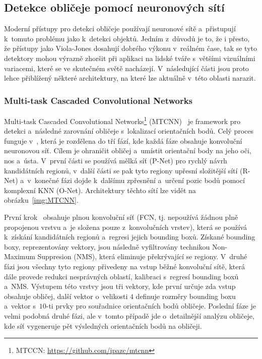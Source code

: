 \subsection{Detekce obličeje pomocí neuronových sítí}
Moderní přístupy pro detekci obličeje používají neuronové sítě a~přistupují k~tomuto problému jako k~detekci objektů. Jedním z~důvodů je to, že i přesto, že přístupy jako Viola-Jones dosahují dobrého výkonu v~reálném čase, tak se tyto detektory mohou výrazně zhoršit při aplikaci na lidské tváře s~většími vizuálními variacemi, které se ve skutečném světě nacházejí. V~následující části jsou proto lehce přiblížený některé architektury, na které lze aktuálně v~této oblasti narazit.

\subsubsection{Multi-task Cascaded Convolutional Networks}
Multi-task Cascaded Convolutional Networks\footnote{MTCCN: \url{https://github.com/ipazc/mtcnn}} (MTCNN)~\cite{website:MTCNN} je framework pro detekci a~následné zarovnání obličeje s~lokalizací orientačních bodů. Celý proces funguje v~\emph{}, která je rozdělena do tří fází, kde každá fáze obsahuje konvoluční neuronovou síť. Cílem je ohraničit obličej a~umístit orientační body na jeho oči, nos a~ústa. V~první části se používá mělká síť (P-Net) pro rychlý návrh kandidátních regionů, v~další části se pak tyto regiony upřesní složitější sítí (R-Net) a~v~konečné fázi dojde k~dalšímu zpřesnění a~určení pozic bodů pomocí komplexní KNN (O-Net). Architektury těchto sítí lze vidět na obrázku~\ref{img:MTCNN}.

První krok~\cite{website:MTCNN, article:MTCNN} obsahuje plnou konvoluční síť (FCN, tj. nepoužívá žádnou plně propojenou vrstvu a~je složena pouze z~konvolučních vrstev), která se používá k~získání kandidátních regionů a~regresi jejich bounding boxů. Získané bounding boxy, reprezentovány vektory, jsou následně vyfiltrovány technikou Non-Maximum Suppresion (NMS), která eliminuje překrývající se regiony. V~druhé fázi jsou všechny tyto regiony přivedeny na vstup běžné konvoluční sítě, která dále provede redukci nesprávných oblastí, kalibraci s~regresí bounding boxů a~NMS. Výstupem této vrstvy jsou tři vektory, kde první určuje zda vstup obsahuje obličej, další vektor o~velikosti $4$ definuje rozměry bounding boxu a~vektor s~$10$-ti prvky pro souřadnice orientačních bodů obličeje. Poslední fáze je velmi podobná druhé fázi, ale v~tomto případě jde o~detailnější analýzu obličeje, kde síť vygeneruje pět výsledných orientačních bodů na obličeji.

